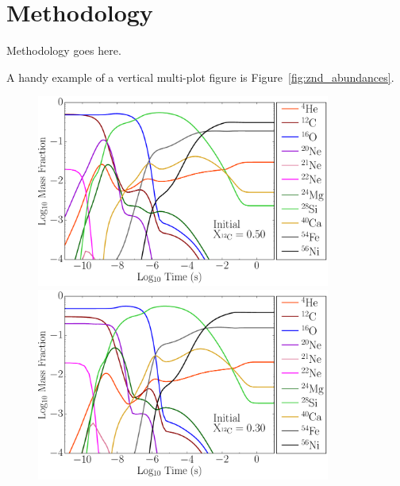 \documentclass[iop,apj]{emulateapj}
\newcommand{\figref}[1]{Figure~\ref{#1}}
\begin{document}
\section{Methodology}

Methodology goes here.

A handy example of a vertical multi-plot figure is \figref{fig:znd_abundances}.

\begin{figure}[t]
	\begin{minipage}{0.5\textwidth}
		\includegraphics[width=0.86\textwidth]{figures/samples/XvsT_wn_0_XC-50.pdf}
	\end{minipage}	
	\hfill
	\begin{minipage}{0.5\textwidth}
		\includegraphics[width=0.86\textwidth]{figures/samples/XvsT_wn_20_XC-30.pdf}
	\end{minipage}

\end{figure}
\end{document}
